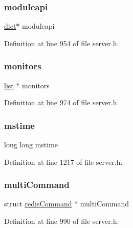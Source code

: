 \subsubsection{\texorpdfstring{moduleapi}{moduleapi}}
{\footnotesize\ttfamily \hyperlink{structdict}{dict}$\ast$ moduleapi}



Definition at line 954 of file server.\+h.

\mbox{\label{structredis_server_adafbaec515301e4446949c48a2670a84}} 
\subsubsection{\texorpdfstring{monitors}{monitors}}
{\footnotesize\ttfamily \hyperlink{structlist}{list} $\ast$ monitors}



Definition at line 974 of file server.\+h.

\mbox{\label{structredis_server_aaef517ca82e5d3ac5b2dbdebbd35f857}} 
\subsubsection{\texorpdfstring{mstime}{mstime}}
{\footnotesize\ttfamily long long mstime}



Definition at line 1217 of file server.\+h.

\mbox{\label{structredis_server_a1a7fbbf584c0a372e035053026784436}} 
\subsubsection{\texorpdfstring{multi\+Command}{multiCommand}}
{\footnotesize\ttfamily struct \hyperlink{structredis_command}{redis\+Command} $\ast$ multi\+Command}



Definition at line 990 of file server.\+h.

\mbox{\label{structredis_server_a792473f9197291c19d0c522011b09630}} 

